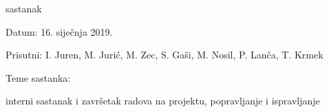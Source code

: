 \begin{packed_enum}
			\item  sastanak
			\item[] \begin{packed_item}
				\item Datum: 16. siječnja 2019.
				\item Prisutni: I. Juren, M. Jurić, M. Zec, S. Gaši, M. Nosil, P. Lanča, T. Krmek
				\item Teme sastanka:
				\begin{packed_item}
					\item interni sastanak i završetak radova na projektu, popravljanje i ispravljanje
				\end{packed_item}
			\end{packed_item}
			
		\end{packed_enum}
		
		\eject
